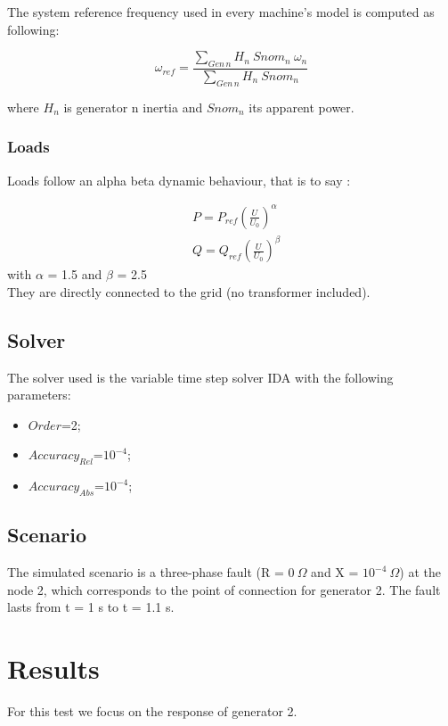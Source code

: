 \documentclass[a4paper, 12pt]{report}
\begin{document}
The system reference frequency used in every machine's model is computed as following:

\[
 \omega_{ref} = \frac{\sum_{Gen \hspace{2pt} n} H_{n} \ Snom_{n} \ \omega_{n}}{\sum_{Gen \hspace{2pt} n} H_{n} \ Snom_{n}}
\]

where $H_{n}$ is generator n inertia and $Snom_{n}$ its apparent power.
\subsubsection{Loads}

Loads follow an alpha beta dynamic behaviour, that is to say :

\[
\begin{aligned}
& P = P_{ref} (\frac{U}{U_{0}})^\alpha \\
& Q = Q_{ref} (\frac{U}{U_{0}})^\beta
\end{aligned}
\]
with $\alpha$ = 1.5 and $\beta$ = 2.5 \\
They are directly connected to the grid (no transformer included).


\subsection{Solver}
The solver used is the variable time step solver IDA with the following parameters:
\begin{itemize}
\item $Order$=2;
\item $Accuracy_{Rel}$=$10^{-4}$;
\item $Accuracy_{Abs}$=$10^{-4}$;
\end{itemize}

\subsection{Scenario}
The simulated scenario is a three-phase fault (R = $0 \ \Omega$ and X = $10^{-4} \ \Omega$) at the node 2, which corresponds to the point of connection for generator 2. The fault lasts from t = 1 s to t = 1.1 s.

\newpage
\section{Results}

For this test we focus on the response of generator 2.\\
\end{document}

